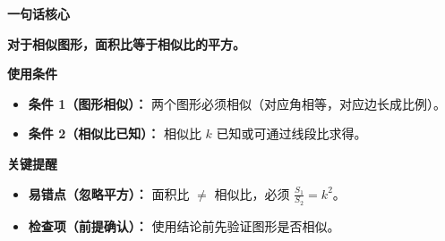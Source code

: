 \begin{summarybox}
	\textbf{\textcolor{CSummary}{一句话核心}}

	\textbf{对于相似图形，面积比等于相似比的平方。}

	\medskip
	\textbf{\textcolor{CSummary}{使用条件}}
	\begin{itemize}[leftmargin=*, itemsep=0.5em, topsep=0.4em]
		\item \textbf{条件 1（图形相似）：} 两个图形必须相似（对应角相等，对应边长成比例）。
		\item \textbf{条件 2（相似比已知）：} 相似比 $k$ 已知或可通过线段比求得。
	\end{itemize}

	\medskip
	\textbf{\textcolor{CSummary}{关键提醒}}
	\begin{itemize}[leftmargin=*, itemsep=0.5em, topsep=0.4em]
		\item \textbf{易错点（忽略平方）：} 面积比 $\neq$ 相似比，必须 $\frac{S_1}{S_2}=k^2$。
		\item \textbf{检查项（前提确认）：} 使用结论前先验证图形是否相似。
	\end{itemize}
\end{summarybox}
